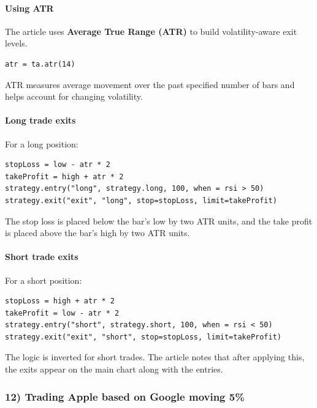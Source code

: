 \documentclass[12pt,openany]{book}
\begin{document}
\paragraph{Using ATR}

The article uses \textbf{Average True Range (ATR)} to build volatility-aware exit levels.

\begin{Verbatim}[breaklines=true,breakanywhere=true,fontsize=\small]
atr = ta.atr(14)
\end{Verbatim}

ATR measures average movement over the past specified number of bars and helps account for changing volatility.

\paragraph{Long trade exits}

For a long position:

\begin{Verbatim}[breaklines=true,breakanywhere=true,fontsize=\small]
stopLoss = low - atr * 2
takeProfit = high + atr * 2
strategy.entry("long", strategy.long, 100, when = rsi > 50)
strategy.exit("exit", "long", stop=stopLoss, limit=takeProfit)
\end{Verbatim}

The stop loss is placed below the bar's low by two ATR units, and the take profit is placed above the bar's high by two ATR units.

\paragraph{Short trade exits}

For a short position:

\begin{Verbatim}[breaklines=true,breakanywhere=true,fontsize=\small]
stopLoss = high + atr * 2
takeProfit = low - atr * 2
strategy.entry("short", strategy.short, 100, when = rsi < 50)
strategy.exit("exit", "short", stop=stopLoss, limit=takeProfit)
\end{Verbatim}

The logic is inverted for short trades. The article notes that after applying this, the exits appear on the main chart along with the entries.

\subsubsection{12) Trading Apple based on Google moving 5\%}
\end{document}
